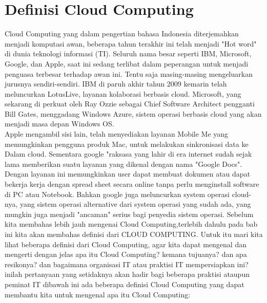 \section{Definisi Cloud Computing}
\tab Cloud Computing yang dalam pengertian bahasa Indonesia diterjemahkan menjadi komputasi awan, beberapa tahun terakhir ini telah menjadi "Hot word" di dunia teknologi informasi (TI). Seluruh nama besar seperti IBM, Microsoft, Google, dan Apple, saat ini sedang terlibat dalam peperangan untuk menjadi penguasa terbesar terhadap awan ini. Tentu saja masing-masing mengeluarkan jurusnya sendiri-sendiri. IBM di paruh akhir tahun 2009 kemarin telah meluncurkan LotusLive, layanan kolaborasi berbasis cloud. Microsoft, yang sekarang di perkuat oleh Ray Ozzie sebagai Chief Software Architect pengganti Bill Gates, menggadang Windows Azure, sistem operasi berbasis cloud yang akan menjadi masa depan Windows OS.\\
\tab Apple mengambil sisi lain, telah menyediakan layanan Mobile Me yang memungkinkan pengguna produk Mac, untuk melakukan sinkronisasi data ke Dalam cloud. Sementara google "raksasa yang lahir di era internet sudah sejak lama memberikan suatu layanan yang dikenal dengan nama "Google Docs". Dengan layanan ini memungkinkan user dapat membuat dokumen atau dapat bekerja kerja dengan spread sheet secara online tanpa perlu menginstall software di PC atau Notebook. Bahkan google juga meluncurkan system operasi cloud-nya, yang sistem operasi alternative dari system operasi yang sudah ada, yang mungkin juga menjadi "ancaman" serius bagi penyedia sistem operasi. Sebelum kita membahas lebih jauh mengenai Cloud Computing,terlebih dahulu pada bab ini kita akan membahas definisi dari CLOUD COMPUTING. Untuk itu mari kita lihat beberapa definisi dari Cloud Computing, agar kita dapat mengenal dan mengerti dengan jelas apa itu Cloud Computing? kemana tujuanya? dan apa resikonya? dan bagaimana organisasi IT atau praktisi IT mempersiapkan ini? inilah pertanyaan yang setidaknya akan hadir bagi beberapa praktisi ataupun peminat IT dibawah ini ada beberapa definisi Cloud Computing yang dapat membantu kita untuk mengenal apa itu Cloud Computing:
